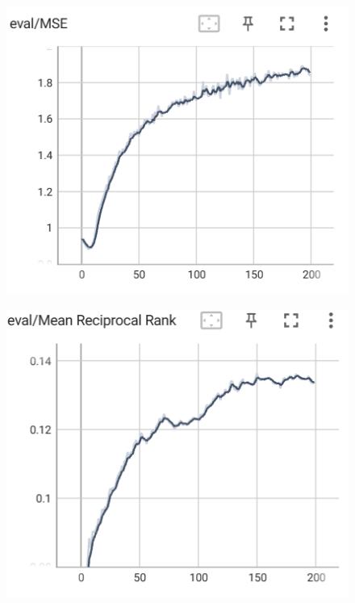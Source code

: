 \documentclass[12pt]{article}
\begin{document}
\begin{enumerate}
    \begin{figure}[htbp]
	\centering
	\begin{minipage}{0.4\linewidth}
		\centering
		\includegraphics[width=0.9\linewidth]{./figs/eval_mse_99_1.png}
		\label{pic one}%
	\end{minipage}
	\begin{minipage}{0.4\linewidth}
		\centering
		\includegraphics[width=0.9\linewidth]{./figs/eval_mrr_99_1.png}
		\label{pic two}%
	\end{minipage}
    \end{figure}
    
    \newpage
    

\end{enumerate}
\end{document}
